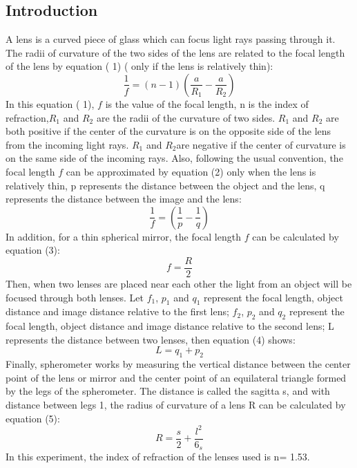 \documentclass[12pt]{article}
\begin{document}
\begin{multicols}{2}

\section*{Introduction}\label{sec:Intro}
A lens is a curved piece of glass which can focus light rays passing through it. The radii of curvature of the two sides of the lens are related to the focal length of the lens by equation ( 1) ( only if the lens is relatively thin):
\begin{equation}
\frac{1}{f} = (n-1)(\frac{a}{{R}_{1}}-\frac{a}{{R}_{2}})
\end{equation}
In this equation ( 1), ${f}$ is the value of the focal length, n is the index of refraction,${R}_{1}$ and ${R}_{2}$ are the radii of the curvature of two sides. ${R}_{1}$ and ${R}_{2}$ are both positive if the center of the curvature is on the opposite side of the lens from the incoming light rays. ${R}_{1}$ and ${R}_{2}$are negative if the center of curvature is on the same side of the incoming rays. Also, following the usual convention, the focal length ${f}$ can be approximated by equation (2) only when the lens is relatively thin, p represents the distance between the object and the lens, q represents the distance between the image and the lens:
\begin{equation} 
\frac{1}{f} = (\frac{1}{{p}}-\frac{1}{{q}})
\end{equation}
In addition, for a thin spherical mirror, the focal length ${f}$ can be calculated by equation (3):
\begin{equation} 
f = \frac{R}{2}
\end{equation}
Then, when two lenses are placed near each other the light from an object will be focused through both lenses. Let ${f_{1}}$, ${p_{1}}$ and ${q_{1}}$  represent the focal length, object distance and image distance relative to the first lens; ${f_{2}}$, ${p_{2}}$ and ${q_{2}}$ represent the focal length, object distance and image distance relative to the
second lens; L represents the distance between two lenses, then equation (4) shows:
\begin{equation} 
L={q}_{1}+{p}_{2}
\end{equation}
Finally, spherometer works by measuring the vertical distance between the center point of the lens or mirror and the center point of an equilateral triangle formed by the legs of the spherometer. The distance is called the sagitta s, and with distance between legs 1, the radius of curvature of a lens R can be calculated by equation (5):
\begin{equation}
R = \frac{s}{2}+\frac{{l}^{2}}{{6}_{s}}
\end{equation} 
In this experiment, the index of refraction of the lenses used is n= 1.53.


\end{multicols}
\end{document}
